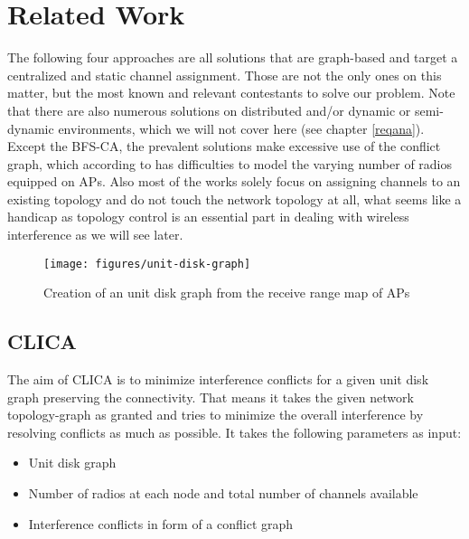 \chapter{Related Work}
  The following four approaches are all solutions that are graph-based and target a centralized and static channel assignment.
  Those are not the only ones on this matter, but the most known and relevant contestants to solve our problem.
  Note that there are also numerous solutions on distributed and/or dynamic or semi-dynamic environments, which we will not cover here (see chapter \ref{reqana}).
  Except the \ac{BFS-CA}, the prevalent solutions make excessive use of the conflict graph, which according to \cite{overview_caa} has difficulties to model 
  the varying number of radios equipped on APs. Also most of the works solely focus on assigning channels to an existing topology and do not touch 
  the network topology at all, what seems like a handicap as topology control is an essential part in dealing with wireless interference as we will see later.
  
  \begin{figure}[h!]
    \centering
    \texttt{[image: figures/unit-disk-graph]}
    \caption{Creation of an unit disk graph from the receive range map of APs}
    \label{fig:unit-disk-graph}
  \end{figure}
  
  \section{\ac{CLICA}}
    The aim of \ac{CLICA} \cite{CLICA} is to minimize interference conflicts for a given unit disk graph preserving the connectivity.
    That means it takes the given network topology-graph as granted and tries to minimize the overall interference by resolving conflicts as much as possible.
    It takes the following parameters as input:
    
    \begin{itemize}
      \item Unit disk graph
      
      \item Number of radios at each node and total number of channels available
      
      \item Interference conflicts in form of a conflict graph
    \end{itemize}
    
